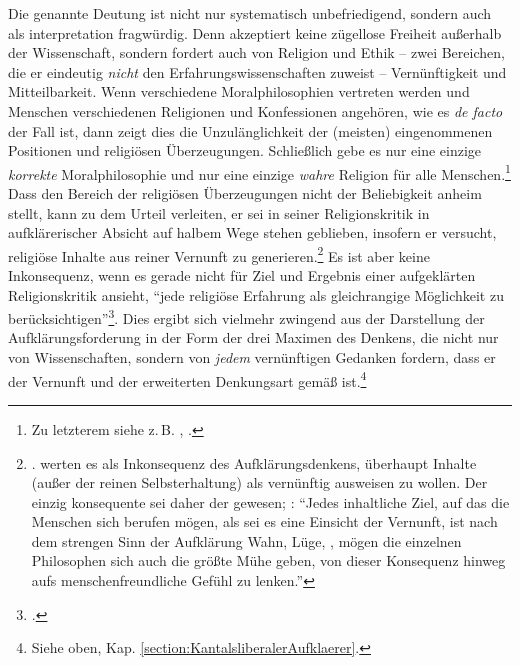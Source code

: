 Die genannte Deutung ist  nicht nur systematisch unbefriedigend, sondern auch
als interpretation fragwürdig. Denn 
akzeptiert keine zügellose Freiheit außerhalb der Wissenschaft, sondern fordert
auch von Religion und Ethik -- zwei Bereichen, die er eindeutig \emph{nicht} den
Erfahrungswissenschaften zuweist -- Vernünftigkeit und Mitteilbarkeit. Wenn
verschiedene Moralphilosophien vertreten werden und Menschen verschiedenen
Religionen und Konfessionen angehören, wie es \emph{de facto} der Fall ist, dann
zeigt dies die Unzulänglichkeit der (meisten) eingenommenen Positionen und
religiösen Überzeugungen. Schließlich gebe es nur eine einzige \emph{korrekte}
Moralphilosophie und nur eine einzige \emph{wahre} Religion für alle
Menschen.\footnote{Zu letzterem siehe z.\,B. \cite[][A
45]{Kant:DerStreitderFakultaeten1977}, \cite[VII:
36.26--32]{Kant:GesammelteWerke1900ff.}.} Dass  den Bereich
der religiösen Überzeugungen nicht der Beliebigkeit anheim stellt, kann zu dem Urteil
verleiten, er sei in seiner Religionskritik in aufklärerischer Absicht auf
halbem Wege stehen geblieben, insofern er versucht, religiöse Inhalte aus reiner
Vernunft zu
generieren.\footnote{\cite[Vgl.][135--137]{LaRocca:WasAufklaerungseinwird2004}.
 werten es als Inkonsequenz des
Aufklärungsdenkens, überhaupt Inhalte (außer der reinen Selbsterhaltung) als
vernünftig ausweisen zu wollen. Der einzig konsequente 
sei daher der  gewesen;
\cite[vgl.][101]{Horkheimer:DialektikderAufklaerung1997}: \enquote{Jedes
inhaltliche Ziel, auf das die Menschen sich berufen mögen, als sei es eine
Einsicht der Vernunft, ist nach dem strengen Sinn der Aufklärung Wahn, Lüge,
, mögen die einzelnen Philosophen sich auch die
größte Mühe geben, von dieser Konsequenz hinweg aufs menschenfreundliche Gefühl zu lenken.}}
Es ist aber keine Inkonsequenz, wenn  es gerade nicht für Ziel und
Ergebnis einer aufgeklärten Religionskritik ansieht, \enquote{jede religiöse
Erfahrung als gleichrangige Möglichkeit zu
berücksichtigen}\footcite[][136]{LaRocca:WasAufklaerungseinwird2004}.
Dies ergibt sich vielmehr zwingend aus der Darstellung der Aufklärungsforderung
in der Form der drei Maximen des Denkens, die nicht nur von Wissenschaften,
sondern von \emph{jedem} vernünftigen Gedanken fordern, dass er der Vernunft und
der erweiterten Denkungsart gemäß ist.\footnote{Siehe oben, Kap.
\ref{section:KantalsliberalerAufklaerer}.}

